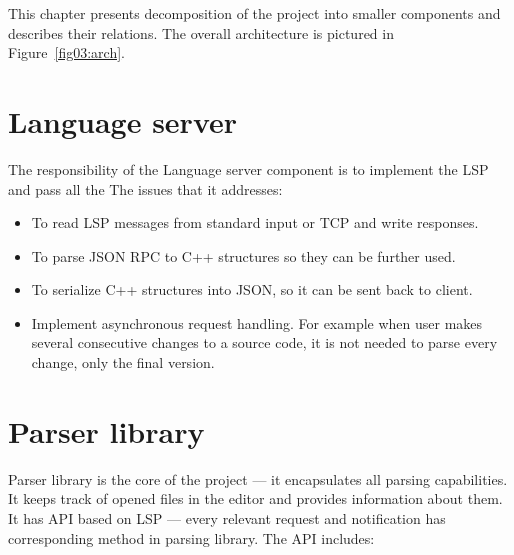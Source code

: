 This chapter presents decomposition of the project into smaller components and describes their relations. The overall architecture is pictured in Figure~\ref{fig03:arch}.

\section{Language server}

The responsibility of the Language server component is to implement the LSP and pass all the  The issues that it addresses:

\begin{itemize}
    \item To read LSP messages from standard input or TCP and write responses.
    \item To parse JSON RPC to C++ structures so they can be further used.
    \item To serialize C++ structures into JSON, so it can be sent back to client.
    \item Implement asynchronous request handling. For example when user makes several consecutive changes to a source code, it is not needed to parse every change, only the final version.
\end{itemize}

\section{Parser library}

Parser library is the core of the project --- it encapsulates all parsing capabilities. It keeps track of opened files in the editor and provides information about them. It has API based on LSP --- every relevant request and notification has corresponding method in parsing library. The API includes:

